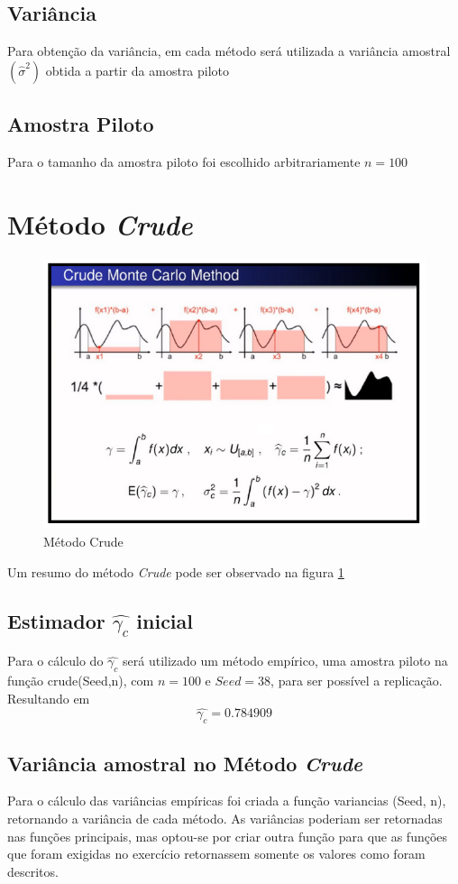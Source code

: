 \documentclass{article}
\begin{document}
\subsection{Variância}

Para obtenção da variância, em cada método será utilizada a variância amostral $(\hat{\sigma}^2)$ obtida a partir da amostra piloto

\subsection{Amostra Piloto}

Para o tamanho da amostra piloto foi escolhido arbitrariamente $n=100$

\section{Método \textit{Crude}}

\begin{figure}[H]
    \centering
    \includegraphics[width=.7\linewidth]{Imagens/MC_Crude.png}
    \caption{Método Crude}
    \label{fig:Crude}
\end{figure}

Um resumo do método \textit{Crude} pode ser observado na figura \ref{fig:Crude} 

\subsection{Estimador $\hat{\gamma_c}$ inicial}
Para o cálculo do $\hat{\gamma_c}$ será utilizado um método empírico, uma amostra piloto na função crude(Seed,n), com $n=100$ e $Seed=38$, para ser possível a replicação.
Resultando em $$\hat{\gamma_c} = 0.784909$$

\subsection{Variância amostral no Método \textit{Crude}}
Para o cálculo das variâncias empíricas foi criada a função variancias (Seed, n), retornando a variância de cada método. As variâncias poderiam ser retornadas nas funções principais, mas optou-se por criar outra função para que as funções que foram exigidas no exercício retornassem somente os valores como foram descritos.
\end{document}
